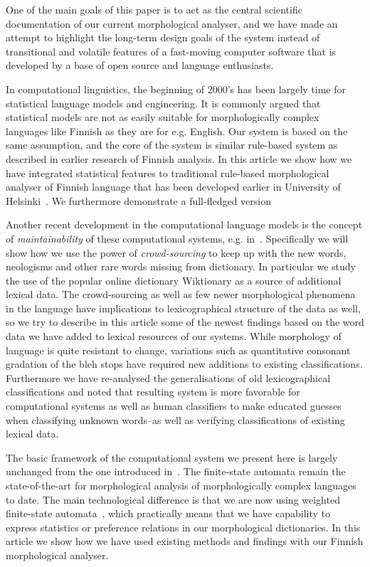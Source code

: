 \documentclass[a4paper,12pt]{article}
\begin{document}
One of the main goals of this paper is to act as the central scientific
documentation of our current morphological analyser, and we have made an
attempt to highlight the long-term design goals of the system instead of
transitional and volatile features of a fast-moving computer software that is
developed by a base of open source and language enthusiasts.

In computational linguistics, the beginning of 2000's has been
largely time for statistical language models and engineering. It is commonly
argued that statistical models are not as easily suitable for morphologically
complex languages like Finnish as they are for e.g. English. Our system is
based on the same assumption, and the core of the system is similar rule-based
system as described in earlier research of Finnish analysis. In this article
we show how we have integrated statistical features to traditional rule-based
morphological analyser of Finnish language that has been developed
earlier in University of Helsinki~\cite{pirinen2008}. We furthermore demonstrate
a full-fledged version

Another recent development in the computational language models is the concept
of \emph{maintainability} of these computational systems, e.g.
in~\cite{maxwell}. Specifically we will show how we use the power of
\emph{crowd-sourcing} to keep up with the new words, neologisms and other rare
words missing from dictionary. In particular we study the use of the popular
online dictionary Wiktionary as a source of additional lexical data. The
crowd-sourcing as well as few newer morphological phenomena in the language
have implications to lexicographical structure of the data as well, so we try
to describe in this article some of the newest findings based on the word data
we have added to lexical resources of our systems. While morphology of language
is quite resistant to change, variations such as quantitative consonant
gradation of the bleh stops have required new additions to existing
classifications. Furthermore we have re-analysed the generalisations of old
lexicographical classifications and noted that resulting system is more
favorable for computational systems as well as human classifiers to make
educated guesses when classifying unknown words–as well as verifying
classifications of existing lexical data.

The basic framework of the computational system we present here is largely
unchanged from the one introduced in~\cite{koskenniemi1983twolevel}. 
The finite-state automata remain the state-of-the-art for morphological analysis
of morphologically complex languages to date. The main
technological difference is that we are now using weighted finite-state 
automata~\cite{openfst}, which practically means that we have capability to
express statistics or preference relations in our morphological dictionaries.
In this article we show how we have used existing methods and findings with
our Finnish morphological analyser.
\end{document}
